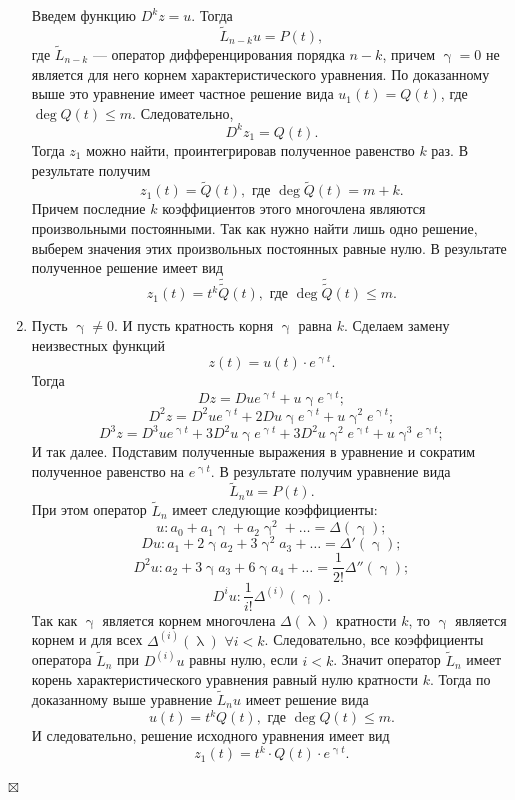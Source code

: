 \documentclass[a4paper, 12pt]{report}
\newenvironment{Proof} %
{\par\noindent{$\blacklozenge$}} %
{\hfill$\scriptstyle\boxtimes$}
\renewcommand{\lambda}{\uplambda}
\begin{document}
\begin{Proof}
\begin{enumerate}
	Введем функцию $D^kz = u$. Тогда $$\widetilde{L}_{n-k}u = P(t),$$ где $\widetilde{L}_{n-k}$ --- оператор дифференцирования порядка $n-k$, причем $\upgamma = 0$ не является для него корнем характеристического уравнения. По доказанному выше это уравнение имеет частное решение вида $u_1(t) = Q(t)$, где $\deg Q(t) \leqslant m$. Следовательно, $$D^kz_1 = Q(t).$$ Тогда $z_1$ можно найти, проинтегрировав полученное равенство $k$ раз. В результате получим $$z_1(t) = \widetilde{Q}(t),\text{ где }\deg \widetilde{Q}(t) = m + k.$$ Причем последние $k$ коэффициентов этого многочлена являются произвольными постоянными. Так как нужно найти лишь одно решение, выберем значения этих произвольных постоянных равные нулю. В результате полученное решение имеет вид $$z_1(t) = t^k\widetilde{\widetilde{Q}}(t),\text{ где }\deg \widetilde{\widetilde{Q}}(t) \leqslant m.$$
	\item Пусть $\upgamma \ne 0$. И пусть кратность корня $\upgamma$ равна $k$. Сделаем замену неизвестных функций $$z(t) = u(t)\cdot e^{\upgamma t}.$$ Тогда
	$$Dz = Due^{\upgamma t} + u \upgamma e ^{\upgamma t};$$
	$$D^2 z = D^2 u e^{\upgamma t} + 2 D u \upgamma e^{\upgamma t} + u\upgamma^2 e^{\upgamma t};$$
	$$D^3 z = D^3 u e^{\upgamma t} + 3 D^2 u \upgamma e^{\upgamma t} + 3 D^2 u \upgamma^2 e^{\upgamma t}+ u\upgamma^3 e^{\upgamma t};$$
	И так далее.
	Подставим полученные выражения в уравнение и сократим полученное равенство на $e^{\upgamma t}$. В результате получим уравнение вида $$\widetilde{L}_nu = P(t).$$ При этом оператор $\widetilde{L}_n$ имеет следующие коэффициенты:
	$$u : a_0 + a_1 \upgamma + a_2 \upgamma^2 + \ldots = \Delta (\upgamma);$$
	$$Du : a_1 + 2\upgamma a_2 + 3\upgamma^2a_3 + \ldots = \Delta' (\upgamma);$$
	$$D^2 u : a_2 + 3\upgamma a_3 + 6\upgamma a_4 + \ldots = \dfrac{1}{2!}\Delta''(\upgamma);$$
	$$D^i u: \dfrac{1}{i!}\Delta^{(i)}(\upgamma).$$
	Так как $\upgamma$ является корнем многочлена $\Delta(\lambda)$ кратности $k$, то $\upgamma$ является корнем и для всех $\Delta^{(i)}(\lambda)$ $\forall i < k$. Следовательно, все коэффициенты оператора $\widetilde{L}_n$ при $D^{(i)}u$ равны нулю, если $i < k$. Значит оператор $\widetilde{L}_n$ имеет корень характеристического уравнения равный нулю кратности $k$. Тогда по доказанному выше уравнение $\widetilde{L}_n u$ имеет решение вида $$u(t) = t^k Q(t),\text{ где }\deg Q(t)\leqslant m.$$ И следовательно, решение исходного уравнения имеет вид $$z_1(t) = t^k\cdot Q(t)\cdot e^{\upgamma t}.$$
\end{enumerate}
\end{Proof}
\end{document}
